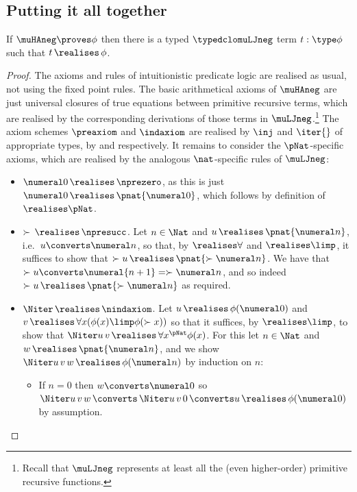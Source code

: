 \subsection{Putting it all together}

\begin{theorem}
    [Soundness]
    \label{thm:realisability-soundness}
    If $\muHAneg \proves \phi$ then there is a typed $\typedclomuLJneg$ term $t:\type \phi$ such that $t\, \realises\, \phi$.
\end{theorem}
\begin{proof}
The axioms and rules of intuitionistic predicate logic are realised as usual, not using the fixed point rules. 
The basic arithmetical axioms of $\muHAneg$ are just universal closures of true equations between primitive recursive terms, which are realised by the corresponding derivations of those terms in $\muLJneg$.\footnote{Recall that $\muLJneg$ represents at least all the (even higher-order) primitive recursive functions.}
The axiom schemes $\preaxiom$ and $\indaxiom$ are realised by $\inj$ and $\iter{}$ of appropriate types, by  and  respectively.
    It remains to consider the $\pNat$-specific axioms,  which are realised by the analogous $\nat$-specific rules of $\muLJneg$:
    \begin{itemize}
        \item $\numeral 0 \, \realises\, \nprezero$, as this is just $\numeral 0\, \realises\, \pnat {\numeral 0}$, which follows by definition of $\realises\pNat$.
        \item $\succ \, \realises\, \npresucc$. Let $n\in \Nat $ and $u\, \realises\, \pnat {\numeral n}$, i.e.\ $u\converts \numeral n$, so that, by $\realises\forall $ and $\realises\limp$, it suffices to show that $\succ u\, \realises\, \pnat{\succ \numeral n}$.
        We have that $\succ u \converts \numeral{n+1} = \succ \numeral n $, and so indeed $\succ u\, \realises\, \pnat{\succ \numeral n}$ as required.
        \item $\Niter\, \realises \, \nindaxiom$.
        Let $u\, \realises\, \phi(\numeral 0)$ and $v\, \realises\, \forall x (\phi(x)\limp \phi(\succ x ))$ so that it suffices, by $\realises\limp$, to show that $\Niter u\, v\, \realises \, \forall x^\pNat \phi(x)$.
        For this let $n\in \Nat $ and $w\, \realises\, \pnat {\numeral n}$, and we show $\Niter u\, v\, w\, \realises\, \phi(\numeral n)$ by induction on $n$:
        \begin{itemize}
            \item If $n=0$ then $w\converts \numeral 0$ so $\Niter u\, v\, w\, \converts\, \Niter u\, v\, 0\, \converts u\, \realises \, \phi(\numeral 0)$ by assumption.

\end{itemize}
\end{itemize}
\end{proof}
